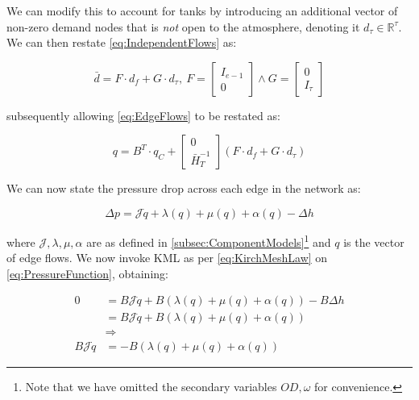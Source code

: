 We can modify this to account for tanks by introducing an additional vector of non-zero demand nodes that is \textit{not} open to the atmosphere, denoting it $d_{\tau} \in \mathbb{R}^{\tau}$. We can then restate \cref{eq:IndependentFlows} as:

\begin{equation}\label{eq:IndependentFlowsWithTank}
	\bar{d} = F\cdot d_f + G \cdot d_{\tau}, 
	\ F = \begin{bmatrix}
		I_{e-1} \\ 0
	\end{bmatrix} 
	\wedge 
	G = \begin{bmatrix}
	0 \\ I_{\tau}
	\end{bmatrix}
\end{equation}

subsequently allowing \cref{eq:EdgeFlows} to be restated as:

\begin{equation}\label{eq:EdgeFlowsWithTank}
	q = B^T\cdot q_C +
	\begin{bmatrix} 0 \\ \bar{H}_T^{-1} \end{bmatrix} (F \cdot d_f + G \cdot d_{\tau})
\end{equation}

We can now state the pressure drop across each edge in the network as:

\begin{equation}\label{eq:PressureFunction}
	\Delta p = \mathcal{J}\dot{q} + \lambda(q) + \mu(q) + \alpha(q) -\Delta h
\end{equation}

where $\mathcal{J}, \lambda, \mu, \alpha$ are as defined in \cref{subsec:ComponentModels}\footnote{Note that we have omitted the secondary variables $OD,\omega$ for convenience.} and $q$ is the vector of edge flows. We now invoke KML as per \cref{eq:KirchMeshLaw} on \cref{eq:PressureFunction}, obtaining:

\begin{equation}\label{eq:PressureFunctionKirch}
	\begin{split}
			0 &= B\mathcal{J}\dot{q} + B(\lambda(q) + \mu(q) + \alpha(q)) -B\Delta h \\
			&= B\mathcal{J}\dot{q} + B(\lambda(q) + \mu(q) + \alpha(q)) \\
			&\Rightarrow \\
			B\mathcal{J}\dot{q} &= -B(\lambda(q) + \mu(q) + \alpha(q))
	\end{split}
\end{equation}

